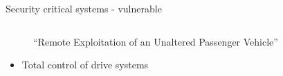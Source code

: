 \documentclass[xcolor={x11names}]{beamer}
\begin{document}
\begin{frame}{Security critical systems - vulnerable}
\begin{columns}
\begin{column}{0.5\textwidth}
\begin{figure}
                \caption{``Remote Exploitation of an Unaltered Passenger Vehicle'' \cite{greenberg_hackers_2015,miller_remote_2015}}
                \label{jeep_offroad}
            \end{figure}
            \pause
            \begin{itemize}
                \item Total control of drive systems
            \end{itemize}
        \end{column}
    \end{columns}
\end{frame}


\end{document}
